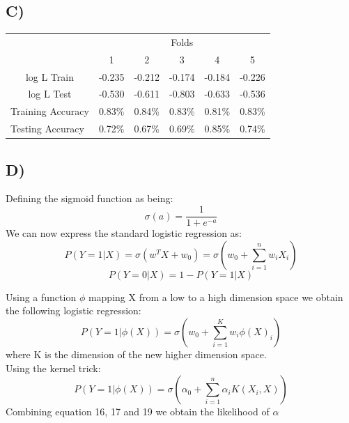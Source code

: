 \documentclass{report}
\begin{document}
\subsection*{C)}
\begin{center}
\begin{table}[h]
 \begin{tabular}{l|c|c|c|c|c|}
 \cline{2-6}
     & \multicolumn{5}{c|}{Folds}      \\ \cline{2-6}
     &  1  &  2  &  3  &  4  &  5 \\ \hline
\multicolumn{1}{|c|}{log L Train} & -0.235 & -0.212 & -0.174 & -0.184 & -0.226  \\ \hline
\multicolumn{1}{|c|}{log L Test} & -0.530 & -0.611 & -0.803 & -0.633 & -0.536  \\ \hline
\multicolumn{1}{|l|}{Training Accuracy} & 0.83\% & 0.84\% & 0.83\% & 0.81\% & 0.83\% \\ \hline
\multicolumn{1}{|l|}{Testing Accuracy} & 0.72\% & 0.67\% & 0.69\% & 0.85\% & 0.74\% \\ \hline
\end{tabular}
\end{table}
\end{center}
\subsection*{D)}
Defining the sigmoid function as being:
\begin{equation}
  \sigma(a) = \frac{1}{1+e^{-a}}
\end{equation}
We can now express the standard logistic regression as:
\begin{equation}
  P(Y = 1 | X) = \sigma(w^TX + w_0) = \sigma(w_0 + \sum_{i=1}^{n}w_iX_i)
\end{equation}
\begin{equation}
  P(Y = 0 | X) = 1 - P(Y = 1 | X)
\end{equation}

Using a function $\phi$ mapping X from a low to a high dimension space we obtain
the following logistic regression:
\begin{equation}
  P(Y = 1 | \phi(X)) = \sigma(w_0 + \sum_{i=1}^{K}w_i\phi(X)_i)
\end{equation}
where K is the dimension of the new higher dimension space.\\
Using the kernel trick:
\begin{equation}
  P(Y = 1 | \phi(X)) = \sigma(\alpha_0 + \sum_{i=1}^{n}\alpha_iK(X_i,X))
\end{equation}
Combining equation 16, 17 and 19 we obtain the likelihood of $\alpha$
\end{document}
